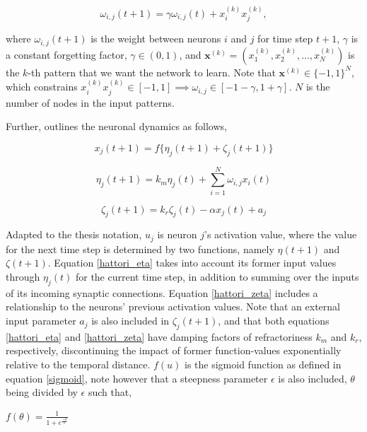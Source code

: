 \begin{equation}\label{hattori_hebbian_learning}
    \omega_{i,j}(t+1) = \gamma \omega_{i,j}(t) + x_i^{(k)} x_j^{(k)},
\end{equation}

where $\omega_{i,j}(t+1)$ is the weight between neurons $i$ and $j$ for time step $t+1$, $\gamma$ is a constant forgetting factor, $\gamma \in (0, 1)$, and $\textbf{x}^{(k)} = (x_1^{(k)}, x_2^{(k)}, ..., x_N^{(k)})$ is the $k$-th pattern that we want the network to learn. Note that $\textbf{x}^{(k)} \in \{-1,1\}^N$, which constrains $x_i^{(k)} x_j^{(k)} \in [-1,1] \implies \omega_{i,j} \in [-1-\gamma, 1+\gamma]$. $N$ is the number of nodes in the input patterns.

Further, \cite{Hattori2010} outlines the neuronal dynamics as follows,

\begin{equation}\label{hattori_next_output}
    x_j(t+1) = f\{\eta_j (t+1) + \zeta_j(t+1)\}
\end{equation}

\begin{equation}\label{hattori_eta}
    \eta_j(t+1) = k_m \eta_j(t) + \sum_{i=1}^{N} \omega_{i,j} x_i(t)
\end{equation}

\begin{equation}\label{hattori_zeta}
    \zeta_j(t+1) = k_r \zeta_j(t) - \alpha x_j(t) + a_j
\end{equation}

Adapted to the thesis notation, $u_j$ is neuron $j$'s activation value, where the value for the next time step is determined by two functions, namely $\eta(t+1)$ and $\zeta(t+1)$. Equation \ref{hattori_eta} takes into account its former input values through $\eta_j(t)$ for the current time step, in addition to summing over the inputs of its incoming synaptic connections. Equation \ref{hattori_zeta} includes a relationship to the neurons' previous activation values. Note that an external input parameter $a_j$ is also included in $\zeta_j(t+1)$, and that both equations \ref{hattori_eta} and \ref{hattori_zeta} have damping factors of refractoriness $k_m$ and $k_r$, respectively, discontinuing the impact of former function-values exponentially relative to the temporal distance. $f(u)$ is the sigmoid function as defined in equation \ref{sigmoid}, note however that a steepness parameter $\epsilon$ is also included, $\theta$ being divided by $\epsilon$ such that,

\begin{center}
\begin{math}
    f(\theta) = \frac{1}{1 + e^{\frac{-\theta}{\epsilon}}}
\end{math}
\end{center}

